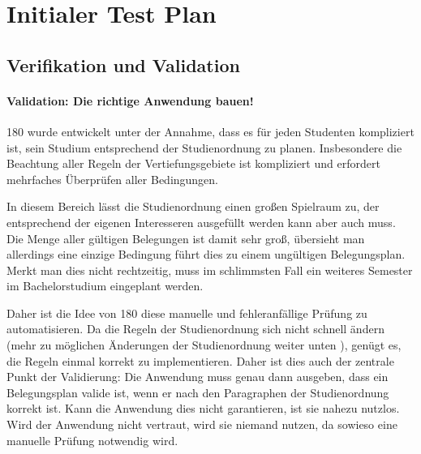 \documentclass[ngerman]{article}
\begin{document}
\section{Initialer Test Plan}

\subsection{Verifikation und Validation}

\paragraph{Validation: Die richtige Anwendung bauen!}

180 wurde entwickelt unter der Annahme, dass es für jeden Studenten kompliziert ist, sein Studium entsprechend der Studienordnung zu planen.
Insbesondere die Beachtung aller Regeln der Vertiefungsgebiete ist kompliziert und erfordert mehrfaches Überprüfen aller Bedingungen.


In diesem Bereich lässt die Studienordnung einen großen Spielraum zu, der entsprechend der eigenen Interesseren ausgefüllt werden kann aber auch muss.
Die Menge aller gültigen Belegungen ist damit sehr groß, übersieht man allerdings eine einzige Bedingung führt dies zu einem ungültigen Belegungsplan.
Merkt man dies nicht rechtzeitig, muss im schlimmsten Fall ein weiteres Semester im Bachelorstudium eingeplant werden.

Daher ist die Idee von 180 diese manuelle und fehleranfällige Prüfung zu automatisieren.
Da die Regeln der Studienordnung sich nicht schnell ändern (mehr zu möglichen Änderungen der Studienordnung weiter unten ), genügt es, die Regeln einmal korrekt zu implementieren.
Daher ist dies auch der zentrale Punkt der Validierung:
Die Anwendung muss genau dann ausgeben, dass ein Belegungsplan valide ist, wenn er nach den Paragraphen der Studienordnung korrekt ist.
Kann die Anwendung dies nicht garantieren, ist sie nahezu nutzlos.
Wird der Anwendung nicht vertraut, wird sie niemand nutzen, da sowieso eine manuelle Prüfung notwendig wird.
\end{document}
